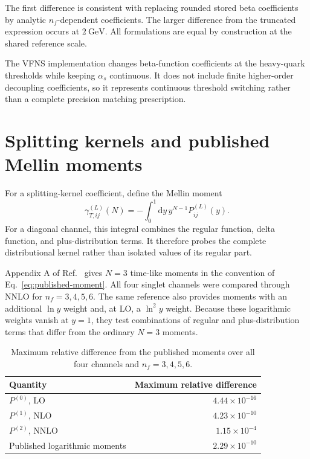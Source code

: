 \documentclass[11pt]{article}
\newcommand{\dd}{\mathrm{d}}
\begin{document}
The first difference is consistent with replacing rounded stored beta
coefficients by analytic \(n_f\)-dependent coefficients. The larger
difference from the truncated expression occurs at \(2~\mathrm{GeV}\).
All formulations are equal by construction at the shared reference scale.

The VFNS implementation changes beta-function coefficients at the heavy-quark
thresholds while keeping \(\alpha_s\) continuous. It does not include finite
higher-order decoupling coefficients, so it represents continuous threshold
switching rather than a complete precision matching prescription.

\section{Splitting kernels and published Mellin moments}

For a splitting-kernel coefficient, define the Mellin moment
\begin{equation}
  \gamma_{T,ij}^{(L)}(N)
  =
  -\int_0^1\dd y\,y^{N-1}P_{ij}^{(L)}(y).
  \label{eq:published-moment}
\end{equation}
For a diagonal channel, this integral combines the regular function, delta
function, and plus-distribution terms. It therefore probes the complete
distributional kernel rather than isolated values of its regular part.

Appendix A of Ref.~\cite{Dixon:2019uzg} gives \(N=3\) time-like moments in
the convention of Eq.~\eqref{eq:published-moment}. All four singlet channels
were compared through NNLO for \(n_f=3,4,5,6\). The same reference also
provides moments with an additional \(\ln y\) weight and, at LO, a
\(\ln^2y\) weight. Because these logarithmic weights vanish at \(y=1\), they
test combinations of regular and plus-distribution terms that differ from
the ordinary \(N=3\) moments.

\begin{table}[H]
\centering
\caption{Maximum relative difference from the published moments over all
four channels and \(n_f=3,4,5,6\).}
\label{tab:published-moments}
\begin{tabular}{lr}
\toprule
Quantity & Maximum relative difference\\
\midrule
\(P^{(0)}\), LO & \(4.44\times10^{-16}\)\\
\(P^{(1)}\), NLO & \(4.23\times10^{-10}\)\\
\(P^{(2)}\), NNLO & \(1.15\times10^{-4}\)\\
Published logarithmic moments & \(2.29\times10^{-10}\)\\
\bottomrule
\end{tabular}
\end{table}
\end{document}
